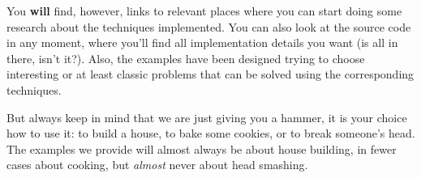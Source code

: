 You \textbf{will} find, however, links to
relevant places where you can start doing some research
about the techniques implemented. You can also look at the
source code in any moment, where you'll find all implementation
details you want (is all in there, isn't it?). Also, the
examples have been designed trying to choose interesting or at least
classic problems that can be solved using the corresponding
techniques. 

But always keep in mind that we are just giving you
a hammer, it is your choice how to use it: to build a house,
to bake some cookies, or to break someone's head. The examples
we provide will almost always be about house building, in fewer
cases about cooking, but \emph{almost} never about head smashing. 